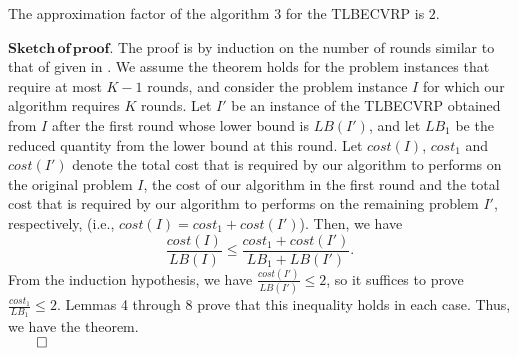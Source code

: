 \begin{theorem} The approximation factor of the algorithm 3 for the TLBECVRP is $2$.
\end{theorem}
\noindent $\mathbf{Sketch \, of \, proof.}$ The proof is by induction on the number of rounds similar to that of given in \cite{Asano2001,Naoki}. We assume the theorem holds for the problem instances that require at most $K-1$ rounds, and consider the problem instance $I$ for which our algorithm requires $K$ rounds. Let $I'$ be an instance of the TLBECVRP obtained from $I$ after the first round whose lower bound is $LB(I')$, and let $LB_1$ be the reduced quantity from the lower bound at this round. Let $cost(I)$, $cost_1$ and $cost(I')$ denote the total cost that is required by our algorithm to performs on the original problem $I$, the cost of our algorithm in the first round and the total cost that is required by our algorithm to performs on the remaining problem $I'$, respectively, (i.e., $cost(I)=cost_1 + cost(I')$). Then, we have
$$\frac{cost(I)}{LB(I)} \le \frac{cost_1+cost(I')}{LB_1+LB(I')}.$$
\noindent From the induction hypothesis, we have $\frac{cost(I')}{LB(I')} \le 2$, so it suffices to prove
$\frac{cost_1}{LB_1} \le 2.$
\noindent Lemmas 4 through 8 prove that this inequality holds in each case. Thus, we have the theorem. \\
$\qed$\\


